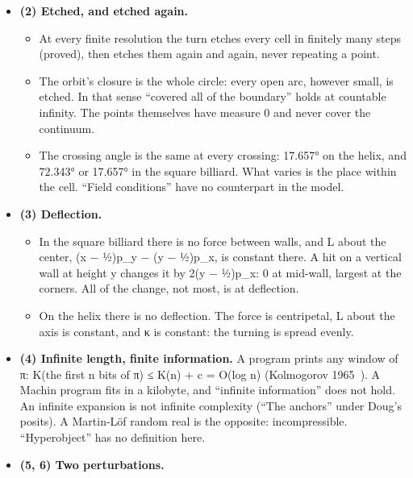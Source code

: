 \begin{itemize}
\item \textbf{(2) Etched, and etched again.}

\begin{itemize}
\item At every finite resolution the turn etches every cell in finitely many steps (proved), then etches them again and again, never repeating a point.
\item The orbit's closure is the whole circle: every open arc, however small, is etched. In that sense “covered all of the boundary” holds at countable infinity. The points themselves have measure 0 and never cover the continuum.
\item The crossing angle is the same at every crossing: 17.657° on the helix, and 72.343° or 17.657° in the square billiard. What varies is the place within the cell. “Field conditions” have no counterpart in the model.
\end{itemize}
\item \textbf{(3) Deflection.}

\begin{itemize}
\item In the square billiard there is no force between walls, and L about the center, (x − ½)p\_\allowbreak{}y − (y − ½)p\_\allowbreak{}x, is constant there. A hit on a vertical wall at height y changes it by 2(y − ½)p\_\allowbreak{}x: 0 at mid-wall, largest at the corners. All of the change, not most, is at deflection.
\item On the helix there is no deflection. The force is centripetal, L about the axis is constant, and κ is constant: the turning is spread evenly.
\end{itemize}
\item \textbf{(4) Infinite length, finite information.} A program prints any window of π: K(the first n bits of π) ≤ K(n) + c = O(log n) (Kolmogorov 1965~\cite{src:Kolmogorov-1965}). A Machin program fits in a kilobyte, and “infinite information” does not hold. An infinite expansion is not infinite complexity (“The anchors” under Doug's posits). A Martin-Löf random real is the opposite: incompressible. “Hyperobject” has no definition here.
\item \textbf{(5, 6) Two perturbations.}


\end{itemize}
